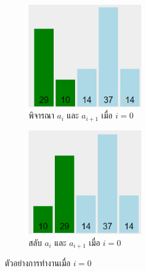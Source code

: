 \begin{figure}[h!]
	\centering
    \begin{subfigure}{.5\textwidth}
    	\centering
        \includegraphics[width=5cm]{images/bubble_sort_1-2}
        \caption{พิจารณา $a_i$ และ $a_{i+1}$ เมื่อ $i=0$}
        \label{fig:bubble_sort_1-2}
    \end{subfigure}%
    \begin{subfigure}{.5\textwidth}
    	\centering
        \includegraphics[width=5cm]{images/bubble_sort_1-2-swap}
        \caption{สลับ $a_i$ และ $a_{i+1}$ เมื่อ $i=0$}
        \label{fig:bubble_sort_1-2-swap}
    \end{subfigure}
    \caption{ตัวอย่างการทำงานเมื่อ $i=0$}
    \label{fig:bubble_sort_round-1-0}
\end{figure}

